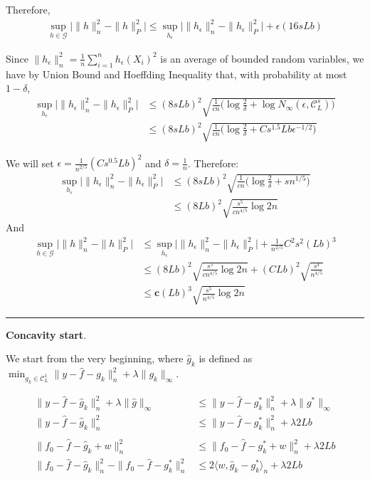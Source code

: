 \documentclass{article}
\begin{document}
{Therefore, 
\begin{align*}
\sup_{h \in \mathcal{G}}  \Big| \|h\|^2_n - \|h\|^2_P \Big| \leq 
\sup_{h_\epsilon} \Big| \|h_\epsilon\|^2_n - \|h_\epsilon\|^2_P \Big| 
        + \epsilon (16 sLb)
\end{align*}

Since $\| h_\epsilon \|_n^2 = \frac{1}{n} \sum_{i=1}^n h_\epsilon(X_i)^2$ is an average of bounded random variables, we have by Union Bound and Hoeffding Inequality that, with probability at most $1 - \delta$,
\begin{align*}
\sup_{h_\epsilon} \Big| \|h_\epsilon\|^2_n - \|h_\epsilon\|^2_P \Big| &\leq
  (8sLb)^2 \sqrt{ \frac{1}{cn} \big(\log \frac{2}{\delta} 
        + \log N_\infty(\epsilon, \mathcal{C}_L^s) \big) } \\
&\leq (8sLb)^2 \sqrt{ \frac{1}{cn} \big(\log \frac{2}{\delta} 
        + C s^{1.5} Lb \epsilon^{-1/2}   \big) }
\end{align*}

We will set $\epsilon = \frac{1}{n^{2/5}} (C s^{0.5} L b)^2$ and $\delta = \frac{1}{n}$. 
Therefore:
\begin{align*}
\sup_{h_\epsilon} \Big|  \|h_\epsilon\|^2_n - \|h_\epsilon\|^2_P \Big| &\leq
   (8sLb)^2 \sqrt{ \frac{1}{cn} \big(\log \frac{2}{\delta} 
        + s n^{1/5}  \big) } \\
  &\leq (8Lb)^2 \sqrt{ \frac{s^5}{cn^{4/5}} \log 2n }
\end{align*}
And
\begin{align*}
\sup_{h \in \mathcal{G}}  \Big| \|h\|^2_n - \|h\|^2_P \Big| &\leq 
\sup_{h_\epsilon} \Big| \|h_\epsilon\|^2_n - \|h_\epsilon\|^2_P \Big| 
        + \frac{1}{n^{2/5}} C^2 s^2 (Lb)^3 \\
  &\leq (8Lb)^2 \sqrt{ \frac{s^5}{c n^{4/5}} \log 2 n}
     + (CLb)^2 \sqrt{ \frac{s^4}{n^{4/5}} } \\
  &\leq \mathbf{c} (Lb)^3 \sqrt{ \frac{s^5}{n^{4/5}} \log 2n}
\end{align*}


\rule{5cm}{0.4pt}
\vspace{0.2in}

\textbf{Concavity start}.

We start from the very beginning, where $\hat{g}_k$ is defined as $\min_{g_k \in \mathcal{C}^1_L} \| y - \hat{f} - g_k \|_n^2 + \lambda \| g_k \|_\infty$.

\begin{align*}
\| y - \hat{f} - \hat{g}_k \|_n^2 + \lambda \| \hat{g} \|_\infty &\leq
   \| y - \hat{f} - g^*_k \|_n^2 + \lambda \| g^* \|_\infty \\
\| y - \hat{f} - \hat{g}_k \|_n^2 &\leq \| y - \hat{f} - g^*_k \|_n^2 + \lambda 2 Lb \\
 &\\
\| f_0 - \hat{f} - \hat{g}_k + w\|_n^2 & \leq \| f_0 - \hat{f} - g^*_k + w \|_n^2 
   +\lambda 2 Lb \\
\| f_0 - \hat{f} - \hat{g}_k \|_n^2 - \|f_0 -\hat{f} - g^*_k\|_n^2 &\leq
   2 \langle w, \hat{g}_k - g^*_k \rangle_n + \lambda 2Lb
\end{align*}

}
\end{document}
